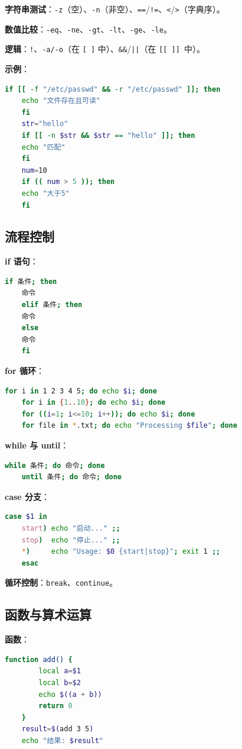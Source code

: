 \textbf{字符串测试}：\texttt{-z}（空）、\texttt{-n}（非空）、\texttt{==}/\texttt{!=}、\texttt{<}/\texttt{>}（字典序）。

\textbf{数值比较}：\texttt{-eq}、\texttt{-ne}、\texttt{-gt}、\texttt{-lt}、\texttt{-ge}、\texttt{-le}。

\textbf{逻辑}：\texttt{!}、\texttt{-a/-o}（在 \texttt{[ ]} 中）、\texttt{\&\&}/\texttt{||}（在 \texttt{[[ ]] }中）。

\textbf{示例}：
\begin{lstlisting}[language=bash]
	if [[ -f "/etc/passwd" && -r "/etc/passwd" ]]; then
	echo "文件存在且可读"
	fi
	str="hello"
	if [[ -n $str && $str == "hello" ]]; then
	echo "匹配"
	fi
	num=10
	if (( num > 5 )); then
	echo "大于5"
	fi
\end{lstlisting}

\subsection{流程控制} \textbf{if 语句}：
\begin{lstlisting}[language=bash]
	if 条件; then
	命令
	elif 条件; then
	命令
	else
	命令
	fi
\end{lstlisting}

\textbf{for 循环}：
\begin{lstlisting}[language=bash]
	for i in 1 2 3 4 5; do echo $i; done
	for i in {1..10}; do echo $i; done
	for ((i=1; i<=10; i++)); do echo $i; done
	for file in *.txt; do echo "Processing $file"; done
\end{lstlisting}

\textbf{while 与 until}：
\begin{lstlisting}[language=bash]
	while 条件; do 命令; done
	until 条件; do 命令; done
\end{lstlisting}

\textbf{case 分支}：
\begin{lstlisting}[language=bash]
	case $1 in
	start) echo "启动..." ;;
	stop)  echo "停止..." ;;
	*)     echo "Usage: $0 {start|stop}"; exit 1 ;;
	esac
\end{lstlisting}

\textbf{循环控制}：\texttt{break}、\texttt{continue}。

\subsection{函数与算术运算} \textbf{函数}：
\begin{lstlisting}[language=bash]
	function add() {
		local a=$1
		local b=$2
		echo $((a + b))
		return 0
	}
	result=$(add 3 5)
	echo "结果: $result"
\end{lstlisting}

